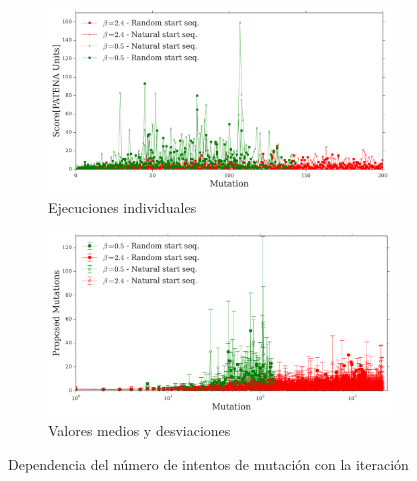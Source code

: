 \begin{figure}[htbp]
\advance\leftskip-1.5cm
  \begin{subfigure}[b]{\textwidth}
    \includegraphics[width=1.1\textwidth]{img/resultados/iterationVsMutAttempts-individual.png}
    \caption{Ejecuciones individuales}
    \label{fig:mutAttemptsVsite-a}
  \end{subfigure}
  \begin{subfigure}[b]{\textwidth}
      \includegraphics[width=1.1\textwidth]{img/resultados/iterationVsMutAttempts-mean.png}
    \caption{Valores medios y desviaciones}
  \label{fig:mutAttemptsVsite-b}
  \end{subfigure}
  \caption{Dependencia del número de intentos de mutación con la iteración}
  \label{fig:mutAttemptsVsite}
\end{figure}





